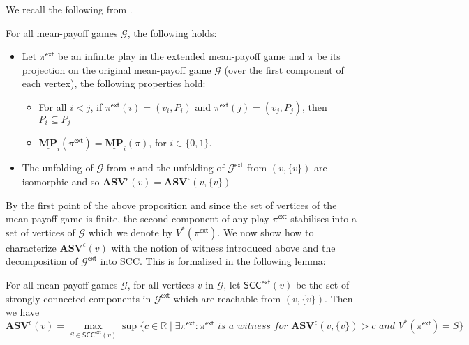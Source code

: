 We recall the following from \cite{FGR20}.
\begin{proposition}
\label{PropExtGamePlayConverges}
For all mean-payoff games $\mathcal{G}$, the following holds:

\begin{itemize}
    \item Let $\pi^{\mathsf{ext}}$ be an infinite play in the extended mean-payoff game and $\pi$ be its projection on the original mean-payoff game $\mathcal{G}$ (over the first component of each vertex), the following properties hold: \begin{itemize}
        \item For all $i < j$, if $\pi^{\mathsf{ext}}(i) = (v_i, P_i)$ and $\pi^{\mathsf{ext}}(j) = (v_j, P_j)$, then $P_i \subseteq P_j$
        \item $\underline{\mathbf{MP}}_i(\pi^{\mathsf{ext}}) = \underline{\mathbf{MP}}_i(\pi)$, for $i \in \{0,1\}$.
    \end{itemize}
    \item The unfolding of $\mathcal{G}$ from $v$ and the unfolding of $\mathcal{G}^{\mathsf{ext}}$ from $(v, \{v\})$ are isomorphic and so $\mathbf{ASV}^{\epsilon}(v) = \mathbf{ASV}^{\epsilon}(v, \{v\})$
\end{itemize}
\end{proposition}

By the first point of the above proposition and since the set of vertices of the mean-payoff game is finite, the second component of any play $\pi^{\mathsf{ext}}$ stabilises into a set of vertices of $\mathcal{G}$ which we denote by $V^{*}(\pi^{\mathsf{ext}})$. We now show how to characterize $\mathbf{ASV}^{\epsilon}(v)$ with the notion of witness introduced above and the decomposition of $\mathcal{G}^{\mathsf{ext}}$ into SCC. This is formalized in the following lemma:

\begin{lemma}
\label{LemASVMaxSCCExtGamePlay}
 For all mean-payoff games $\mathcal{G}$, for all vertices $v$ in $\mathcal{G}$, let $\mathsf{SCC}^{\mathsf{ext}}(v)$ be the set of strongly-connected components in $\mathcal{G}^{\mathsf{ext}}$ which are reachable from $(v, \{v\})$. Then we have
 \begin{equation*}
     \mathbf{ASV}^{\epsilon}(v) = \max \limits_{S \in \mathsf{SCC}^{\mathsf{ext}}(v)} \sup \{c \in \mathbb{R} \mid \exists \pi^{\mathsf{ext}}: \pi^{\mathsf{ext}} \textit{ is a witness for } \mathbf{ASV}^{\epsilon}(v, \{v\}) > c \textit{ and } V^{*}(\pi^{\mathsf{ext}}) = S \}
 \end{equation*}
\end{lemma}

